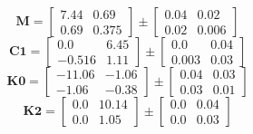\documentclass[../../report/parameterReport.tex]{subfiles}
\begin{document}
\begin{equation}
\mathbf{M}=
\left[
\begin{array}{rr}
    7.44 & 0.69\\
    0.69 & 0.375
\end{array}
\right]
\pm
\left[
\begin{array}{rr}
    0.04 & 0.02\\
    0.02 & 0.006
\end{array}
\right]
\label{eq:M}
\end{equation}
\begin{equation}
\mathbf{C1}=
\left[
\begin{array}{rr}
    0.0 & 6.45\\
    -0.516 & 1.11
\end{array}
\right]
\pm
\left[
\begin{array}{rr}
    0.0 & 0.04\\
    0.003 & 0.03
\end{array}
\right]
\label{eq:C1}
\end{equation}
\begin{equation}
\mathbf{K0}=
\left[
\begin{array}{rr}
    -11.06 & -1.06\\
    -1.06 & -0.38
\end{array}
\right]
\pm
\left[
\begin{array}{rr}
    0.04 & 0.03\\
    0.03 & 0.01
\end{array}
\right]
\label{eq:K0}
\end{equation}
\begin{equation}
\mathbf{K2}=
\left[
\begin{array}{rr}
    0.0 & 10.14\\
    0.0 & 1.05
\end{array}
\right]
\pm
\left[
\begin{array}{rr}
    0.0 & 0.04\\
    0.0 & 0.03
\end{array}
\right]
\label{eq:K2}
\end{equation}
\end{document}
